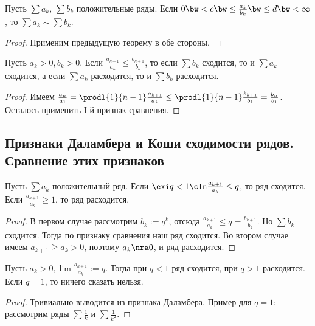 \documentclass[a4paper]{article}
\begin{document}
\begin{theorem}
Пусть $\sum a_k$, $\sum b_k$ положительные ряды. Если $0 \bw< c \bw\le \frac{a_k}{b_k} \bw\le d \bw< \infty$, то $\sum a_k\sim\sum b_k$.
\end{theorem}
\begin{proof}
Применим предыдущую теорему в обе стороны.
\end{proof}

\begin{theorem}
Пусть $a_k>0, b_k>0$. Если $\frac{a_{k+1}}{a_k} \le \frac{b_{k+1}}{b_k}$, то если $\sum b_k$ сходится, то и
$\sum a_k$ сходится, а если $\sum a_k$ расходится, то и $\sum b_k$ расходится.
\end{theorem}
\begin{proof}
Имеем $\frac{a_n}{a_1} = \prodl{1}{n-1} \frac{a_{k+1}}{a_k} \le \prodl{1}{n-1} \frac{b_{k+1}}{b_k} = \frac{b_n}{b_1}$. Осталось применить
I-й признак сравнения.
\end{proof}

\subsection{Признаки Даламбера и Коши сходимости рядов. Сравнение этих признаков}

\begin{theorem}
Пусть $\sum a_k$ положительный ряд. Если $\exi q < 1\cln \frac{a_{k+1}}{a_k} \le q$, то ряд сходится.
Если $\frac{a_{k+1}}{a_k} \ge 1$, то ряд расходится.
\end{theorem}
\begin{proof}
В первом случае рассмотрим $b_k := q^k$, отсюда $\frac{a_{k+1}}{a_k} \le q = \frac{b_{k+1}}{b_k}$.
Но $\sum b_k$ сходится. Тогда по признаку сравнения наш ряд сходится. Во втором случае имеем
$a_{k+1} \ge a_k > 0$, поэтому $a_k \nra 0$, и ряд расходится.
\end{proof}

\begin{theorem}
Пусть $a_k > 0, \lim \frac{a_{k+1}}{a_k}:=q$. Тогда при $q < 1$ ряд сходится, при $q > 1$ расходится. Если $q=1$, то ничего сказать нельзя.
\end{theorem}
\begin{proof}
Тривиально выводится из признака Даламбера. Пример для $q=1$: рассмотрим ряды $\sum \frac{1}{k}$ и $\sum \frac{1}{k^2}$.
\end{proof}
\end{document}
